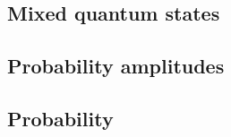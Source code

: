 
\subsection{Mixed quantum states}


\subsection{Probability amplitudes}

\subsection{Probability}


